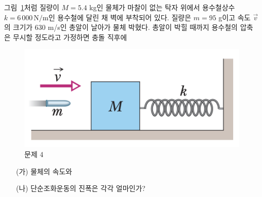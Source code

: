 \documentclass[floatfix,nofootinbib,superscriptaddress,fleqn]{revtex4-2}
\begin{document}
\vspace{1.cm}
 

그림~\ref{fig:3}처럼 질량이 $M=5.4$ kg인 물체가 마찰이 없는 탁자
위에서 용수철상수 $k=6\,000\,\mathrm{N/m}$인 용수철에 달린 채 벽에
부착되어 있다. 질량은 $m=95$ g이고 속도 $\vec{v}$의 크기가 630 m/s인
총알이 날아가 물체 박혔다. 총알이 박힐 때까지 용수철의 압축은 무시할
정도라고 가정하면 충돌 직후에
\begin{figure}[ht]
  \centering
\includegraphics[scale=0.35]{Qfig18-3-20220511.png}
  \caption{문제 4}
  \label{fig:3}
\end{figure}
\begin{itemize}
\item[(가)] 물체의 속도와 
\item[(나)] 단순조화운동의 진폭은 각각 얼마인가?
\end{itemize}
 
\end{document}
